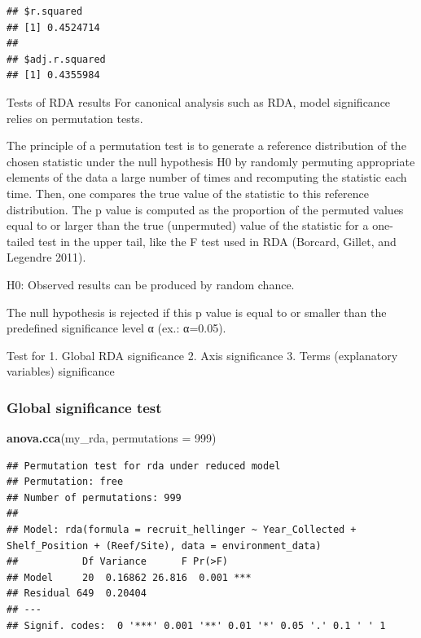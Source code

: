 \documentclass[
]{article}
\newenvironment{Shaded}{\begin{snugshade}}{\end{snugshade}}
\newcommand{\AttributeTok}[1]{\textcolor[rgb]{0.13,0.29,0.53}{#1}}
\newcommand{\DecValTok}[1]{\textcolor[rgb]{0.00,0.00,0.81}{#1}}
\newcommand{\FunctionTok}[1]{\textcolor[rgb]{0.13,0.29,0.53}{\textbf{#1}}}
\newcommand{\NormalTok}[1]{#1}
\begin{document}
\begin{verbatim}
## $r.squared
## [1] 0.4524714
## 
## $adj.r.squared
## [1] 0.4355984
\end{verbatim}

Tests of RDA results For canonical analysis such as RDA, model
significance relies on permutation tests.

The principle of a permutation test is to generate a reference
distribution of the chosen statistic under the null hypothesis H0 by
randomly permuting appropriate elements of the data a large number of
times and recomputing the statistic each time. Then, one compares the
true value of the statistic to this reference distribution. The p value
is computed as the proportion of the permuted values equal to or larger
than the true (unpermuted) value of the statistic for a one-tailed test
in the upper tail, like the F test used in RDA (Borcard, Gillet, and
Legendre 2011).

H0: Observed results can be produced by random chance.

The null hypothesis is rejected if this p value is equal to or smaller
than the predefined significance level α (ex.: α=0.05).

Test for 1. Global RDA significance 2. Axis significance 3. Terms
(explanatory variables) significance

\subsubsection{Global significance test}\label{global-significance-test}

\begin{Shaded}
\begin{Highlighting}[]
\FunctionTok{anova.cca}\NormalTok{(my\_rda, }\AttributeTok{permutations =} \DecValTok{999}\NormalTok{)}
\end{Highlighting}
\end{Shaded}

\begin{verbatim}
## Permutation test for rda under reduced model
## Permutation: free
## Number of permutations: 999
## 
## Model: rda(formula = recruit_hellinger ~ Year_Collected + Shelf_Position + (Reef/Site), data = environment_data)
##           Df Variance      F Pr(>F)    
## Model     20  0.16862 26.816  0.001 ***
## Residual 649  0.20404                  
## ---
## Signif. codes:  0 '***' 0.001 '**' 0.01 '*' 0.05 '.' 0.1 ' ' 1
\end{verbatim}
\end{document}
